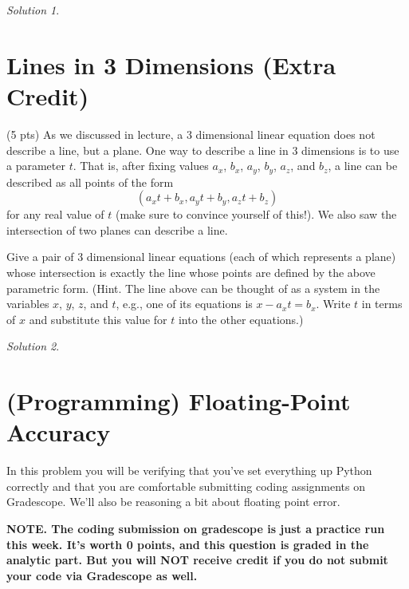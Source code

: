 \documentclass{article}
\theoremstyle{remark}
\newtheorem*{solution}{Solution}
\begin{document}
\begin{solution}
\end{solution}

\pagebreak
\section{Lines in 3 Dimensions (Extra Credit)}

(5 pts) As we discussed in lecture, a 3 dimensional linear equation does not describe a line, but a plane.
One way to describe a line in 3 dimensions is to use a parameter $t$.
That is, after fixing values $a_x$, $b_x$, $a_y$, $b_y$, $a_z$, and $b_z$, a line can be described as all points of the form
\begin{displaymath}
  (a_xt + b_x, a_yt + b_y, a_zt + b_z)
\end{displaymath}
for any real value of $t$ (make sure to convince yourself of this!).
We also saw the intersection of two planes can describe a line.

Give a pair of 3 dimensional linear equations (each of which represents a plane) whose intersection is exactly the line whose points are defined by the above parametric form. (Hint. The line above can be thought of as a system in the variables $x$, $y$, $z$, and $t$, e.g., one of its equations is $x - a_xt = b_x$. Write $t$ in terms of $x$ and substitute this value for $t$ into the other equations.)

\begin{solution}
\end{solution}

\pagebreak
\section{(Programming) Floating-Point Accuracy}

In this problem you will be verifying that you've set everything up Python correctly and that you are comfortable submitting coding assignments on Gradescope.
We'll also be reasoning a bit about floating point error.

\textbf{NOTE. The coding submission on gradescope is just a practice run this week. It's worth 0 points, and this question is graded in the analytic part. But you will NOT receive credit if you do not submit your code via Gradescope as well.}
\end{document}
